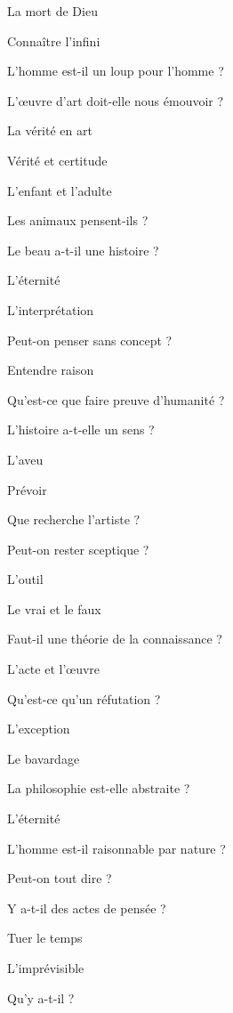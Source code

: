 \documentclass[a4paper,12pt]{article}
\begin{document}
\begin{multicols}{2}
\noindent La mort de Dieu \par
\noindent Connaître l'infini \par
\noindent L'homme est-il un loup pour l'homme ? \par
\noindent L'œuvre d'art doit-elle nous émouvoir ? \par
\noindent La vérité en art \par
\noindent Vérité et certitude \par
\noindent L'enfant et l'adulte \par
\noindent Les animaux pensent-ils ? \par
\noindent Le beau a-t-il une histoire ? \par
\noindent L'éternité \par
\noindent L'interprétation \par
\noindent Peut-on penser sans concept ? \par
\noindent Entendre raison \par
\noindent Qu'est-ce que faire preuve d'humanité ? \par
\noindent L'histoire a-t-elle un sens ? \par
\noindent L'aveu \par
\noindent Prévoir \par
\noindent Que recherche l'artiste ? \par
\noindent Peut-on rester sceptique ? \par
\noindent L'outil \par
\noindent Le vrai et le faux \par
\noindent Faut-il une théorie de la connaissance ? \par
\noindent L’acte et l’œuvre \par
\noindent Qu’est-ce qu'un réfutation ? \par
\noindent L’exception \par
\noindent Le bavardage \par
\noindent La philosophie est-elle abstraite ? \par
\noindent L’éternité \par
\noindent L’homme est-il raisonnable par nature ? \par
\noindent Peut-on tout dire ? \par
\noindent Y a-t-il des actes de pensée ? \par
\noindent Tuer le temps \par
\noindent L’imprévisible \par
\noindent Qu’y a-t-il ? \par

\end{multicols}
\end{document}
